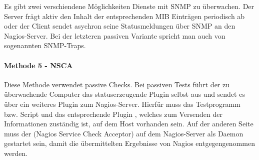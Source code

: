 Es gibt zwei verschiendene Möglichkeiten Dienste mit \gls{SNMP} zu überwachen.
Der Server frägt aktiv den Inhalt der entsprechenden \gls{MIB} Einträgen periodisch ab oder der Client sendet asychron seine Statusmeldungen über \gls{SNMP} an den Nagios-Server.
Bei der letzteren passiven Variante spricht man auch von sogenannten \gls{SNMP}-Traps.






\paragraph{Methode 5 - NSCA}
Diese Methode verwendet passive Checks.
Bei passiven Tests führt der zu überwachende Computer das statuserzeugende Plugin selbst aus und sendet es über ein weiteres Plugin zum Nagios-Server.
Hierfür muss das Testprogramm bzw. Script und das entsprechende Plugin , welches zum Versenden der Informationen zuständig ist, auf dem Host vorhanden sein.
Auf der anderen Seite muss der  (Nagios Service Check Acceptor) auf dem Nagios-Server als Daemon gestartet sein, damit die übermittelten Ergebnisse von Nagios entgegengenommen werden.

